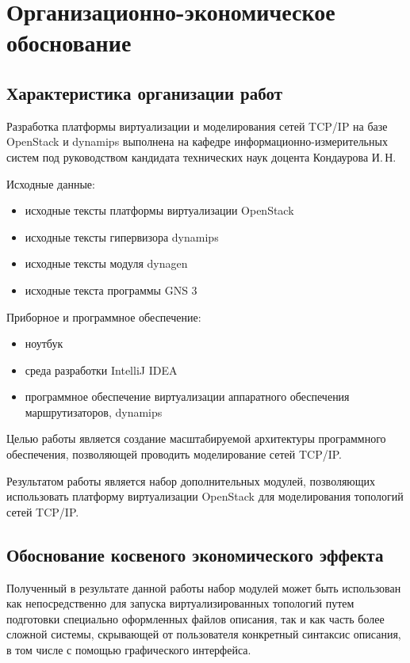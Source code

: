 \chapter{Организационно-экономическое обоснование}

\section{Характеристика организации работ}

Разработка платформы виртуализации и моделирования сетей TCP/IP на базе OpenStack и dynamips выполнена на кафедре информационно-измерительных систем под руководством кандидата технических наук доцента Кондаурова И.\,Н. 

Исходные данные: 
\begin{itemize}
   \item исходные тексты платформы виртуализации OpenStack
   \item исходные тексты гипервизора dynamips
   \item исходные тексты модуля dynagen
   \item исходные текста программы GNS 3
\end{itemize}

Приборное и программное обеспечение:
\begin{itemize}
    \item ноутбук
    \item среда разработки IntelliJ IDEA
    \item программное обеспечение виртуализации аппаратного обеспечения маршрутизаторов, dynamips
\end{itemize}

Целью работы является создание масштабируемой архитектуры программного обеспечения, позволяющей проводить моделирование сетей TCP/IP.

Результатом работы является набор дополнительных модулей, позволяющих использовать
платформу виртуализации OpenStack для моделирования топологий сетей TCP/IP.

\section{Обоснование косвеного экономического эффекта}

Полученный в результате данной работы набор модулей может быть использован как 
непосредственно для запуска виртуализированных топологий путем подготовки специально
оформленных файлов описания, так и как часть более сложной системы, скрывающей от
пользователя конкретный синтаксис описания, в том числе с помощью графического 
интерфейса.

